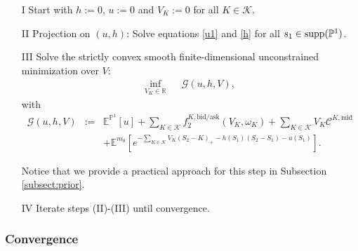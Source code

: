 \documentclass{amsart}%
\def\b*{\begin{eqnarray*}}
\def\e*{\end{eqnarray*}}
\def \E{\mathbb{E}}
\def \P{{\mathbb P}}
\def \R{\mathbb{R}}
\def\Cc{{\cal C}}
\def\Gc{{\cal G}}
\def\Kc{{\cal K}}
\def\no{\noindent}
\theoremstyle{definition}
\newtheorem{defn}[thm]{Definition}
\theoremstyle{remark}
\newcommand{\PP}{\mathbb{P}}
\newcommand{\beaa}{\begin{eqnarray*}}
\newcommand{\eeaa}{\end{eqnarray*}}
\newcommand{\EE}{{\mathbb E}}
\newcommand{\RR}{{\mathbb R}}
\newcommand{\cal}{\mathcal}
\begin{document}
\begin{enumerate}
\item[I] Start with $h:=0$, $u:=0$ and $V_K:=0$ for all $K \in {\cal K}$.
\item[II] Projection on $(u,h)$: Solve equations \eqref{u1} and \eqref{h} for all $s_1\in{\rm supp}(\P^1)$.
\item[III] Solve the strictly convex smooth finite-dimensional unconstrained minimization over $V$:
\beaa  \inf_{V_K \in \RR}&&\Gc(u,h,V),
\eeaa
with
\b*
\Gc(u,h,V)&:=& \E^{\P^1}[u]+ \sum_{K \in {\cal K}}f_2^{K,\mathrm{bid}/\mathrm{ask}}(V_K,\omega_K)+\sum_{K \in {\cal K}}  V_K \Cc^{K,\mathrm{mid}}\\
&&+\EE^{{m_0}}\left[  e^{- \sum_{K \in {\cal K}} V_K (S_{2}-K)_+ -h(S_1)(S_2-S_1)-u(S_1)  }\right].\label{eq:minsinkhorn}
\e*

\no Notice that we provide a practical approach for this step in Subsection \ref{subsect:prior}.


\item[IV] Iterate steps (II)-(III) until convergence.
\end{enumerate}

\subsubsection{Convergence}

%
\end{document}
